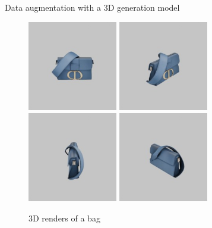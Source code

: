 \documentclass{beamer}
\begin{document}
\begin{frame}{Data augmentation with a 3D generation model}
    \begin{figure}
        \centering
        \includegraphics[width=0.35\textwidth]{assets/M9204UMOSM49E-1.jpeg}
        \includegraphics[width=0.35\textwidth]{assets/M9204UMOSM49E-2.jpeg}
        \includegraphics[width=0.35\textwidth]{assets/M9204UMOSM49E-3.jpeg}
        \includegraphics[width=0.35\textwidth]{assets/M9204UMOSM49E-4.jpeg}
        \caption{3D renders of a bag}
    \end{figure}
\end{frame}
\end{document}
